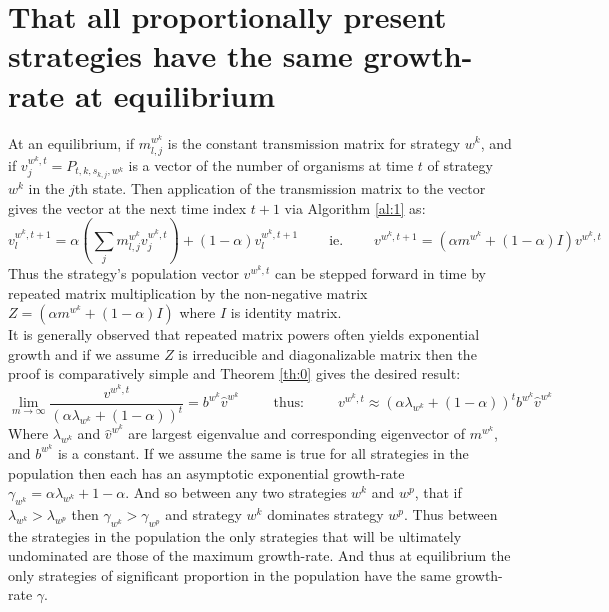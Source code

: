 \section{That all proportionally present strategies have the same growth-rate at equilibrium}\label{appendix1}
At an equilibrium, if $m^{w^k}_{l,j}$ is the constant transmission matrix for strategy $w^k$, and if $v^{w^k,t}_j=P_{t,k,s_{k,j},w^k}$ is a vector of the number of organisms at time $t$ of strategy $w^k$ in the $j$th state.
Then application of the transmission matrix to the vector gives the vector at the next time index $t+1$ via Algorithm \ref{al:1} as:
$$ v^{w^k,t+1}_l=\alpha\left(\sum_jm^{w^k}_{l,j}v^{w^k,t}_j\right) + (1-\alpha)v^{w^k,t+1}_l ~~~~~~~~~~\text{ie.}~~~~~~~~~~v^{w^k,t+1} = \left(\alpha m^{w^k} + (1-\alpha)I\right)v^{w^k,t}$$
Thus the strategy's population vector $v^{w^k,t}$ can be stepped forward in time by repeated matrix multiplication by the non-negative matrix $Z = (\alpha m^{w^k} + (1-\alpha)I)$ where $I$ is identity matrix.\\
It is generally observed that repeated matrix powers often yields exponential growth and if we assume $Z$ is irreducible and diagonalizable matrix then the proof is comparatively simple and Theorem \ref{th:0} gives the desired result:
\begin{equation}\label{eq:growth}\lim_{m\rightarrow\infty}\frac{v^{w^k,t}}{(\alpha\lambda_{w^k}+(1-\alpha))^t}=b^{w^k}\hat{v}^{w^k}~~~~~~~~~~~\text{thus:}~~~~~~~~~~~v^{w^k,t}\approx(\alpha\lambda_{w^k}+(1-\alpha))^tb^{w^k}\hat{v}^{w^k}\end{equation}
Where $\lambda_{w^k}$ and $\hat{v}^{w^k}$ are largest eigenvalue and corresponding eigenvector of $m^{w^k}$, and $b^{w^k}$ is a constant.
If we assume the same is true for all strategies in the population then each has an asymptotic exponential growth-rate $\gamma_{w^k}=\alpha\lambda_{w^k}+1-\alpha$.
And so between any two strategies $w^k$ and $w^p$, that if $\lambda_{w^k}>\lambda_{w^p}$ then $\gamma_{w^k}>\gamma_{w^p}$ and strategy $w^k$ dominates strategy $w^p$.
Thus between the strategies in the population the only strategies that will be ultimately undominated are those of the maximum growth-rate.
And thus at equilibrium the only strategies of significant proportion in the population have the same growth-rate $\gamma$.
\\

